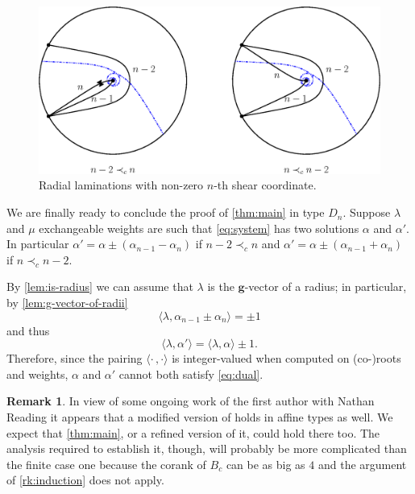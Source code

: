 \documentclass[11pt]{amsart}
\newcommand{\bg}{\mathbf{g}}
\theoremstyle{definition}
\newtheorem{remark}[theorem]{Remark}
\numberwithin{equation}{section}
\numberwithin{figure}{section}
\begin{document}
  \begin{figure}
    \begin{center}
      \includegraphics[scale=0.7]{D_n-weights.eps}
    \end{center}
    \caption{Radial laminations with non-zero $n$-th shear coordinate.}
    \label{fig:D_n-weights}
  \end{figure}

  We are finally ready to conclude the proof of \cref{thm:main} in type $D_n$.
  Suppose $\lambda$ and $\mu$ exchangeable weights are such that \cref{eq:system} has two solutions $\alpha$ and $\alpha'$.
  In particular $\alpha' = \alpha \pm (\alpha_{n-1}-\alpha_n)$ if $n-2 \prec_c n$ and $\alpha' = \alpha \pm (\alpha_{n-1}+\alpha_n)$ if $n \prec_c n-2$.
  
  By \cref{lem:is-radius} we can assume that $\lambda$ is the $\bg$-vector of a radius; in particular, by \cref{lem:g-vector-of-radii}
  \[
    \langle \lambda, \alpha_{n-1}\pm \alpha_n \rangle = \pm 1
  \]
  and thus
  \[
    \langle \lambda, \alpha' \rangle =
    \langle \lambda, \alpha \rangle \pm 1.
  \]
  Therefore, since the pairing $\langle\cdot\,,\cdot\rangle$ is integer-valued when computed on (co-)roots and weights, $\alpha$ and $\alpha'$ cannot both satisfy \cref{eq:dual}.

  \begin{remark}
    In view of some ongoing work of the first author with Nathan Reading it appears that a modified version of \cite[Propositions 5.1 and 5.2]{Ste13} holds in affine types as well.
    We expect that \cref{thm:main}, or a refined version of it, could hold there too.
    The analysis required to establish it, though, will probably be more complicated than the finite case one because the corank of $B_c$ can be as big as $4$ and the argument of \cref{rk:induction} does not apply.
  \end{remark}



\end{document}
